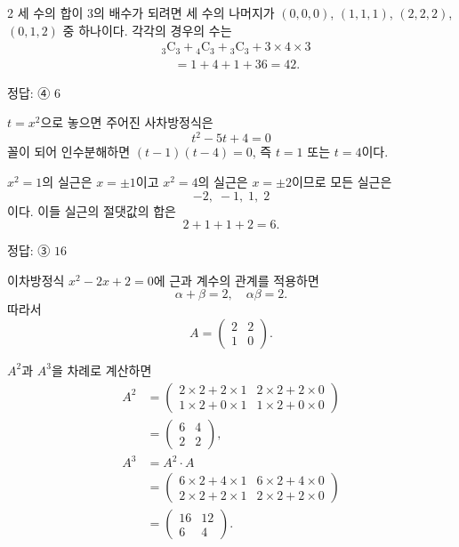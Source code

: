 \documentclass[10pt]{article}
\begin{document}
\begin{multicols}{2}
세 수의 합이 $3$의 배수가 되려면 세 수의 나머지가 $(0, 0, 0)$, $(1, 1, 1)$, $(2, 2, 2)$, $(0, 1, 2)$ 중 하나이다. 각각의 경우의 수는
\begin{align*}
&{}_3\mathrm{C}_3 + {}_4\mathrm{C}_3 + {}_3\mathrm{C}_3 + 3 \times 4 \times 3 \\
&\quad = 1 + 4 + 1 + 36 = 42.
\end{align*}

\begin{answerbox}정답: ④ $6$\end{answerbox}

$t = x^2$으로 놓으면 주어진 사차방정식은
\[ t^2 - 5t + 4 = 0 \]
꼴이 되어 인수분해하면 $(t - 1)(t - 4) = 0$, 즉 $t = 1$ 또는 $t = 4$이다.

$x^2 = 1$의 실근은 $x = \pm 1$이고 $x^2 = 4$의 실근은 $x = \pm 2$이므로 모든 실근은
\[ -2,\; -1,\; 1,\; 2 \]
이다. 이들 실근의 절댓값의 합은
\[ 2 + 1 + 1 + 2 = 6. \]

\begin{answerbox}정답: ③ $16$\end{answerbox}

이차방정식 $x^2 - 2x + 2 = 0$에 근과 계수의 관계를 적용하면
\[ \alpha + \beta = 2, \quad \alpha \beta = 2. \]
따라서
\[ A = \begin{pmatrix} 2 & 2 \\ 1 & 0 \end{pmatrix}. \]

$A^2$과 $A^3$을 차례로 계산하면
\begin{align*}
A^2 &= \begin{pmatrix} 2 \times 2 + 2 \times 1 & 2 \times 2 + 2 \times 0 \\ 1 \times 2 + 0 \times 1 & 1 \times 2 + 0 \times 0 \end{pmatrix} \\[2pt]
    &= \begin{pmatrix} 6 & 4 \\ 2 & 2 \end{pmatrix}, \\[4pt]
A^3 &= A^2 \cdot A \\
    &= \begin{pmatrix} 6 \times 2 + 4 \times 1 & 6 \times 2 + 4 \times 0 \\ 2 \times 2 + 2 \times 1 & 2 \times 2 + 2 \times 0 \end{pmatrix} \\[2pt]
    &= \begin{pmatrix} 16 & 12 \\ 6 & 4 \end{pmatrix}.
\end{align*}


\end{multicols}
\end{document}
